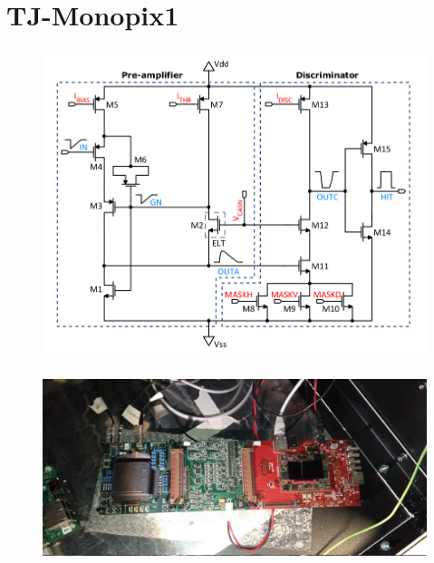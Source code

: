 \section{TJ-Monopix1}

    \begin{frame}
        \frametitle{}
        \begin{figure}[h!]
            \centering
            \includegraphics[width=.8\linewidth]{figures/Monopix1/Monopix1_FE_circuit.png}        
        \end{figure}
    \end{frame}     

    \begin{frame}
        \frametitle{}
        \begin{figure}[h!]
            \centering
            \includegraphics[width=.8\linewidth]{figures/Monopix1/monopix1_front.jpeg}
        \end{figure}

    \end{frame} 

